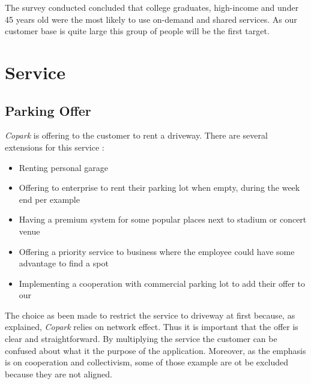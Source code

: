 \documentclass[12pt,a4paper,oneside]{book}
\newcommand{\bp}{\textit{Copark }}
\begin{document}
The survey conducted concluded that college graduates, high-income and under 45 years old were the most likely to use on-demand and shared services.\cite{airbnbuse} As our customer base is quite large this group of people will be the first target.

\section{Service}
\subsection{Parking Offer}
\bp is offering to the customer to rent a driveway. There are several extensions for this service :
\begin{itemize}
\item Renting personal garage
\item Offering to enterprise to rent their parking lot when empty, during the week end per example
\item Having a premium system for some popular places next to stadium or concert venue
\item Offering a priority service to business where the employee could have some advantage to find a spot
\item Implementing a cooperation with commercial parking lot to add their offer to our
\end{itemize} 
The choice as been made to restrict the service to driveway at first because, as explained, \bp relies on network effect. Thus it is important that the offer is clear and straightforward. By multiplying the service the customer can be confused about what it the purpose of the application. Moreover, as the emphasis is on cooperation and collectivism, some of those example are ot be excluded because they are not aligned.
\end{document}
